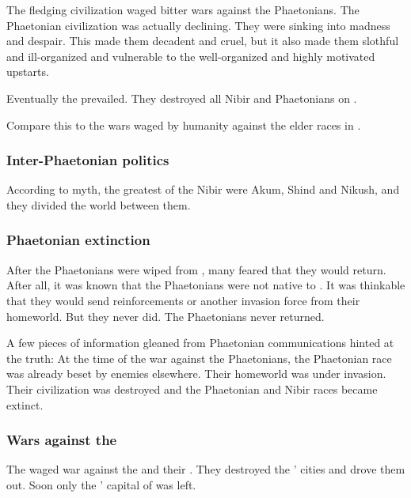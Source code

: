 The fledging \ophidian civilization waged bitter wars against the Phaetonians.
The Phaetonian civilization was actually declining. 
They were sinking into madness and despair.
This made them decadent and cruel, but it also made them slothful and ill-organized and vulnerable to the well-organized and highly motivated \caisith upstarts. 

Eventually the \caisith prevailed. 
They destroyed all Nibir and Phaetonians on \Miith. 

Compare this to the wars waged by humanity against the elder races in \cite{RobertEHoward:TheShadowKingdom}. 





\subsubsection{Inter-Phaetonian politics}
According to myth, the greatest of the Nibir were Akum, Shind and Nikush, and they divided the world between them. 






\subsubsection{Phaetonian extinction}
After the Phaetonians were wiped from \Miith, many \caisith feared that they would return. 
After all, it was known that the Phaetonians were not native to \Miith. 
It was thinkable that they would send reinforcements or another invasion force from their homeworld. 
But they never did.
The Phaetonians never returned. 

A few pieces of information gleaned from Phaetonian communications hinted at the truth: 
At the time of the \caisith war against the Phaetonians, the Phaetonian race was already beset by enemies elsewhere. 
Their homeworld was under \bane invasion. 
Their civilization was destroyed and the Phaetonian and Nibir races became extinct. 





\subsubsection[Wars against the Shugul]{Wars against the \moonthings}
The \ophidians waged war against the \moonthings and their \moongods.
They destroyed the \moonthings' cities and drove them out.
Soon only the \moonthings' capital of \Nom was left.

